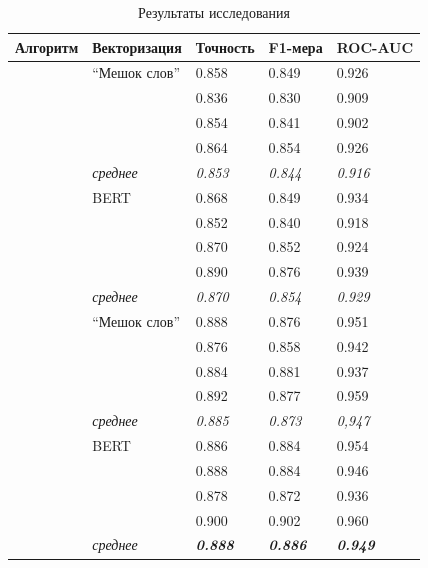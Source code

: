 \begin{table}[H]
	\begin{center}
		\captionsetup{justification=centering}
		\caption{\label{table:result1} Результаты исследования}
		\begin{tabular}{|p{3cm}|p{4cm}|p{2.4cm}|p{2.4cm}|p{2.4cm}|}
				\hline
			Алгоритм & Векторизация & Точность & F1-мера & ROC-AUC \\
				\hline\hline
			
& ``Мешок слов'' & 0.858 & 0.849 & 0.926 \\
				&& 0.836 & 0.830 & 0.909 \\
				&& 0.854 & 0.841 & 0.902 \\
				&& 0.864 & 0.854 & 0.926 \\
				 & \textit{среднее} & \textit{0.853} & \textit{0.844} & \textit{0.916} \\
		  & BERT & 0.868 & 0.849 & 0.934 \\
				&& 0.852 & 0.840 & 0.918 \\
				&& 0.870 & 0.852 & 0.924 \\
				&& 0.890 & 0.876 & 0.939 \\
				 & \textit{среднее} & \textit{0.870} & \textit{0.854} & \textit{0.929} \\
			\hline\hline
			
& ``Мешок слов'' & 0.888 & 0.876 & 0.951 \\
				&& 0.876 & 0.858 & 0.942 \\
				&& 0.884 & 0.881 & 0.937 \\
				&& 0.892 & 0.877 & 0.959 \\
				 & \textit{среднее} & \textit{0.885} & \textit{0.873} & \textit{0,947} \\
		  & BERT & 0.886 & 0.884 & 0.954 \\
				&& 0.888 & 0.884 & 0.946 \\
				&& 0.878 & 0.872 & 0.936 \\
				&& 0.900 & 0.902 & 0.960 \\
				 & \textit{среднее} & \textbf{\textit{0.888}} & \textbf{\textit{0.886}} & \textbf{\textit{0.949}} \\
			\hline\hline
			

\end{tabular}
\end{center}
\end{table}
